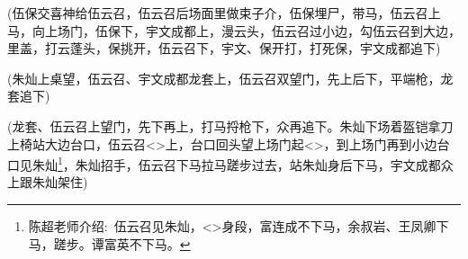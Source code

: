 {{

(伍保{\hwfs 交喜神给}伍云召，伍云召{\hwfs 后场面里做束子介}，伍保{\hwfs 埋尸}，{\hwfs 带马}，伍云召{\hwfs 上马}，{\hwfs 向上场门}，伍保{\hwfs 下}，宇文成都{\hwfs 上}，{\hwfs 漫}云{\hwfs 头}，伍云召{\hwfs 过小边}，{\hwfs 勾}伍云召{\hwfs 到大边}，{\hwfs 里盖}，{\hwfs 打}云{\hwfs 蓬头}，保{\hwfs 挑开}，伍云召{\hwfs 下}，宇文、保{\hwfs 开打}，{\hwfs 打死}保，宇文成都{\hwfs 追下})

\vspace{5pt}



(朱灿{\hwfs 上桌望}，伍云召、宇文成都{\hwfs 龙套上}，伍云召{\hwfs 双望门}，{\hwfs 先上后下}，{\hwfs 平端枪}，{\hwfs 龙套追下})


\vspace{5pt}

(龙套、伍云召{\hwfs 上望门}，{\hwfs 先下再上}，{\hwfs 打马捋枪下}，众{\hwfs 再追下}。朱灿{\hwfs 下场着盔铠拿刀上椅站大边台口}，伍云召\textless{}\!\textgreater{}{\hwfs 上}，{\hwfs 台口回头望上场门起}\textless{}\!\textgreater{}，{\hwfs 到上场门再到小边台口见}朱灿\footnote{陈超老师介绍:~伍云召见朱灿，\textless{}\!\textgreater{}身段，富连成不下马，余叔岩、王凤卿下马，蹉步。谭富英不下马。}，朱灿{\hwfs 招手}，伍云召{\hwfs 下马拉马蹉步过去}，{\hwfs 站}朱灿{\hwfs 身后下马}，宇文成都众{\hwfs 上跟}朱灿{\hwfs 架住})

}}
